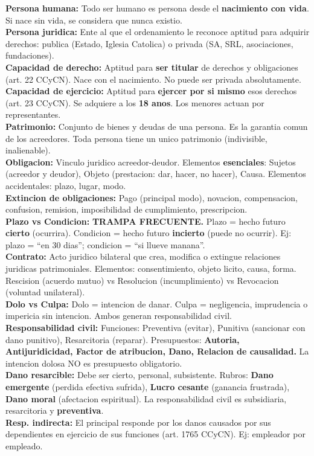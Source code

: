 \documentclass[10pt, a4paper]{article}
\newcommand{\D}[2]{\textbf{\color{azul}#1:} #2\\[1pt]}
\newcommand{\alerta}[1]{\textbf{\color{naranja}#1}}
\begin{document}
\begin{cajaClave}
\D{Persona humana}{Todo ser humano es persona desde el \textbf{nacimiento con vida}. Si nace sin vida, se considera que nunca existio.}
\D{Persona juridica}{Ente al que el ordenamiento le reconoce aptitud para adquirir derechos: publica (Estado, Iglesia Catolica) o privada (SA, SRL, asociaciones, fundaciones).}
\D{Capacidad de derecho}{Aptitud para \textbf{ser titular} de derechos y obligaciones (art. 22 CCyCN). Nace con el nacimiento. No puede ser privada absolutamente.}
\D{Capacidad de ejercicio}{Aptitud para \textbf{ejercer por si mismo} esos derechos (art. 23 CCyCN). Se adquiere a los \textbf{18 anos}. Los menores actuan por representantes.}
\D{Patrimonio}{Conjunto de bienes y deudas de una persona. Es la garantia comun de los acreedores. Toda persona tiene un unico patrimonio (indivisible, inalienable).}
\D{Obligacion}{Vinculo juridico acreedor-deudor. Elementos \textbf{esenciales}: Sujetos (acreedor y deudor), Objeto (prestacion: dar, hacer, no hacer), Causa. Elementos accidentales: plazo, lugar, modo.}
\D{Extincion de obligaciones}{Pago (principal modo), novacion, compensacion, confusion, remision, imposibilidad de cumplimiento, prescripcion.}
\D{Plazo vs Condicion}{\alerta{TRAMPA FRECUENTE.} Plazo = hecho futuro \textbf{cierto} (ocurrira). Condicion = hecho futuro \textbf{incierto} (puede no ocurrir). Ej: plazo = ``en 30 dias''; condicion = ``si llueve manana''.}
\D{Contrato}{Acto juridico bilateral que crea, modifica o extingue relaciones juridicas patrimoniales. Elementos: consentimiento, objeto licito, causa, forma. Rescision (acuerdo mutuo) vs Resolucion (incumplimiento) vs Revocacion (voluntad unilateral).}
\D{Dolo vs Culpa}{Dolo = intencion de danar. Culpa = negligencia, imprudencia o impericia sin intencion. Ambos generan responsabilidad civil.}
\D{Responsabilidad civil}{Funciones: Preventiva (evitar), Punitiva (sancionar con dano punitivo), Resarcitoria (reparar). Presupuestos: \textbf{Autoria, Antijuridicidad, Factor de atribucion, Dano, Relacion de causalidad.} La intencion dolosa NO es presupuesto obligatorio.}
\D{Dano resarcible}{Debe ser cierto, personal, subsistente. Rubros: \textbf{Dano emergente} (perdida efectiva sufrida), \textbf{Lucro cesante} (ganancia frustrada), \textbf{Dano moral} (afectacion espiritual). La responsabilidad civil es subsidiaria, resarcitoria y \textbf{preventiva}.}
\D{Resp. indirecta}{El principal responde por los danos causados por sus dependientes en ejercicio de sus funciones (art. 1765 CCyCN). Ej: empleador por empleado.}
\end{cajaClave}
\end{document}
